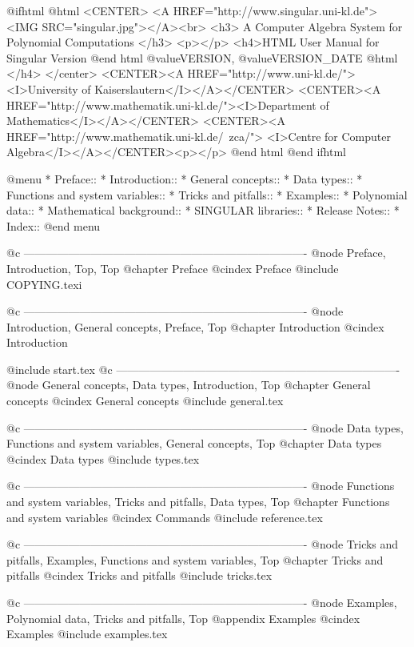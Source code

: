 @ifhtml
@html
<CENTER>
<A HREF="http://www.singular.uni-kl.de">
<IMG SRC="singular.jpg"></A><br>
<h3> A Computer Algebra System for Polynomial Computations </h3>
<p></p>
<h4>HTML User Manual for Singular Version
@end html
@value{VERSION}, @value{VERSION_DATE}
@html
</h4>
</center>
<CENTER><A HREF="http://www.uni-kl.de/"><I>University of Kaiserslautern</I></A></CENTER>
<CENTER><A HREF="http://www.mathematik.uni-kl.de/"><I>Department of Mathematics</I></A></CENTER>
<CENTER><A HREF="http://www.mathematik.uni-kl.de/~zca/">
<I>Centre for Computer Algebra</I></A></CENTER><p></p>
@end html
@end ifhtml

@menu
* Preface::
* Introduction::
* General concepts::
* Data types::
* Functions and system variables::
* Tricks and pitfalls::
* Examples::
* Polynomial data::
* Mathematical background::
* SINGULAR libraries::
* Release Notes::
* Index::
@end menu

@c ----------------------------------------------------------------------------
@node Preface, Introduction, Top, Top
@chapter Preface
@cindex Preface
@include COPYING.texi

@c ----------------------------------------------------------------------------
@node Introduction, General concepts, Preface, Top
@chapter Introduction
@cindex Introduction

@include start.tex
@c ----------------------------------------------------------------------------
@node General concepts, Data types, Introduction, Top
@chapter General concepts
@cindex General concepts
@include general.tex

@c ----------------------------------------------------------------------------
@node Data types, Functions and system variables, General concepts, Top
@chapter Data types
@cindex Data types
@include types.tex

@c ----------------------------------------------------------------------------
@node Functions and system variables, Tricks and pitfalls, Data types, Top
@chapter Functions and system variables
@cindex Commands
@include reference.tex

@c ----------------------------------------------------------------------------
@node Tricks and pitfalls, Examples, Functions and system variables, Top
@chapter Tricks and pitfalls
@cindex Tricks and pitfalls
@include tricks.tex

@c ----------------------------------------------------------------------------
@node Examples, Polynomial data, Tricks and pitfalls, Top
@appendix Examples
@cindex Examples
@include examples.tex

